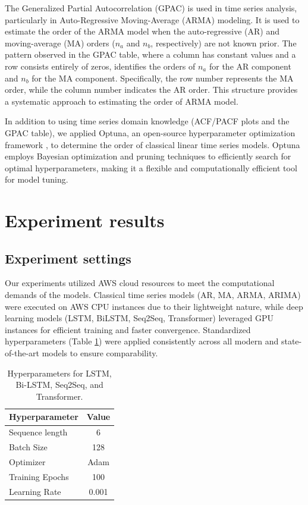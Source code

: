 \documentclass[sn-mathphys-num]{sn-jnl}
\theoremstyle{thmstyleone}%
\theoremstyle{thmstyletwo}%
\theoremstyle{thmstylethree}%
\begin{document}
The Generalized Partial Autocorrelation (GPAC) is used in time series analysis, particularly in Auto-Regressive Moving-Average (ARMA) modeling. It is used to estimate the order of the ARMA model when the auto-regressive (AR) and moving-average (MA) orders (\( n_a \) and \( n_b \), respectively) are not known prior. The pattern observed in the GPAC table, where a column has constant values and a row consists entirely of zeros, identifies the orders of \( n_a \) for the AR component and \( n_b \) for the MA component. Specifically, the row number represents the MA order, while the column number indicates the AR order. This structure provides a systematic approach to estimating the order of ARMA model.


In addition to using time series domain knowledge (ACF/PACF plots and the GPAC table), we applied Optuna, an open-source hyperparameter optimization framework \cite{akiba2019optuna}, to determine the order of classical linear time series models. Optuna employs Bayesian optimization and pruning techniques to efficiently search for optimal hyperparameters, making it a flexible and computationally efficient tool for model tuning.

\section{Experiment results}

\subsection{Experiment settings}
Our experiments utilized AWS cloud resources to meet the computational demands of the models. Classical time series models (AR, MA, ARMA, ARIMA) were executed on AWS CPU instances due to their lightweight nature, while deep learning models (LSTM, BiLSTM, Seq2Seq, Transformer) leveraged GPU instances for efficient training and faster convergence. Standardized hyperparameters (Table \ref{tab:hyperparams}) were applied consistently across all modern and state-of-the-art models to ensure comparability.
\setlength{\tabcolsep}{0.2pt} 
\begin{table}[]
\centering
\begin{tabular}{lc}
\hline
\textbf{Hyperparameter} & \hspace{3cm} \textbf{Value} \\ \hline
Sequence length         & \hspace{3cm} 6           \\ 
Batch Size              & \hspace{3cm} 128           \\ 
Optimizer               & \hspace{3cm} Adam          \\ 
Training Epochs         & \hspace{3cm} 100           \\ 
Learning Rate           & \hspace{3cm} 0.001         \\ \hline
\end{tabular}
\caption{Hyperparameters for LSTM, Bi-LSTM, Seq2Seq, and Transformer.}
\label{tab:hyperparams}
\end{table}
\end{document}
